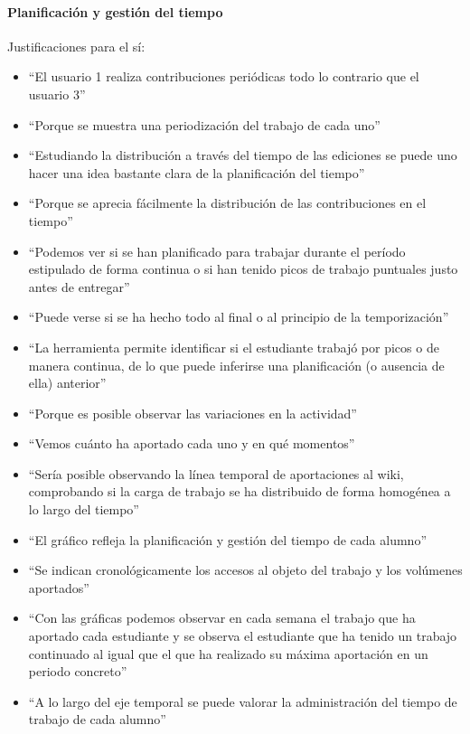 \paragraph*{Planificación y gestión del tiempo}

Justificaciones para el sí:

\begin{itemize}
\item ``El usuario 1 realiza contribuciones periódicas todo lo contrario que el usuario 3''
\item ``Porque se muestra una periodización del trabajo de cada uno''
\item ``Estudiando la distribución a través del tiempo de las ediciones se puede uno hacer una idea bastante clara de la planificación del tiempo''
\item ``Porque se aprecia fácilmente la distribución de las contribuciones en el tiempo''
\item ``Podemos ver si se han planificado para trabajar durante el período estipulado de forma continua o si han tenido picos de trabajo puntuales justo antes de entregar''
\item ``Puede verse si se ha hecho todo al final o al principio de la temporización''
\item ``La herramienta permite identificar si el estudiante trabajó por picos o de manera continua, de lo que puede inferirse una planificación (o ausencia de ella) anterior''
\item ``Porque es posible observar las variaciones en la actividad''
\item ``Vemos cuánto ha aportado cada uno y en qué momentos''
\item ``Sería posible observando la línea temporal de aportaciones al wiki, comprobando si la carga de trabajo se ha distribuido de forma homogénea a lo largo del tiempo''
\item ``El gráfico refleja la planificación y gestión del tiempo de cada alumno''
\item ``Se indican cronológicamente los accesos al objeto del trabajo y los volúmenes aportados''
\item ``Con las gráficas podemos observar en cada semana el trabajo que ha aportado cada estudiante y se observa el estudiante que ha tenido un trabajo continuado al igual que el que ha realizado su máxima aportación en un periodo concreto''
\item ``A lo largo del eje temporal se puede valorar la administración del tiempo de trabajo de cada alumno''

\end{itemize}
